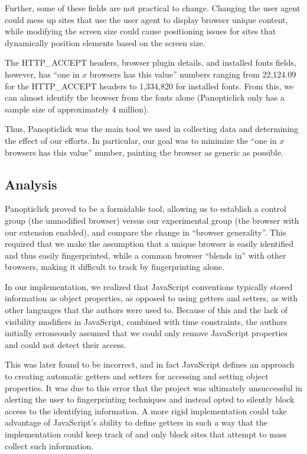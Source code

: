 \documentclass[12pt,a4paper]{article}
\begin{document}
Further, some of these fields are not practical to change. Changing the user agent could mess up sites that use the user agent to display browser unique content, while modifying the screen size could cause positioning issues for sites that dynamically position elements based on the screen size.

The HTTP\_ACCEPT headers, browser plugin details, and installed fonts fields, however, has ``one in $x$ browsers has this value'' numbers ranging from 22,124.09 for the HTTP\_ACCEPT headers to 1,334,820 for installed fonts. From this, we can almost identify the browser from the fonts alone (Panopticlick only has a sample size of approximately 4 million).

Thus, Panopticlick was the main tool we used in collecting data and determining the effect of our efforts. In particular, our goal was to minimize the ``one in $x$ browsers has this value'' number, painting the browser as generic as possible.

\subsection{Analysis}
Panopticlick proved to be a formidable tool, allowing us to establish a control group (the unmodified browser) versus our experimental group (the browser with our extension enabled), and compare the change in ``browser generality''. This required that we make the assumption that a unique browser is easily identified and thus easily fingerprinted, while a common browser ``blends in'' with other browsers, making it difficult to track by fingerprinting alone.

In our implementation, we realized that JavaScript conventions typically stored information as object properties, as opposed to using getters and setters, as with other languages that the authors were used to. Because of this and the lack of visibility modifiers in JavaScript, combined with time constraints, the authors initially erroneously assumed that we could only remove JavaScript properties and could not detect their access.

This was later found to be incorrect, and in fact JavaScript defines an approach to creating automatic getters and setters for accessing and setting object properties. It was due to this error that the project was ultimately unsuccessful in alerting the user to fingerprinting techniques and instead opted to silently block access to the identifying information. A more rigid implementation could take advantage of JavaScript's ability to define getters in such a way that the implementation could keep track of and only block sites that attempt to mass collect such information.
\end{document}
